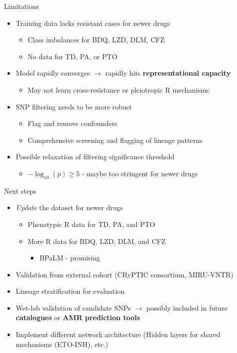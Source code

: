 \documentclass[pdf]{beamer} %
\begin{document}
\begin{frame}{Limitations}
  \begin{itemize}
    \item Training data lacks resistant cases for newer drugs
      \begin{itemize}
        \item Class imbalances for BDQ, LZD, DLM, CFZ
        \item No data for TD, PA, or PTO
      \end{itemize}
    \item Model rapidly converges $\rightarrow$ rapidly hits \textbf{representational capacity}
      \begin{itemize}
        \item May not learn cross-resistance or pleiotropic R mechanisms
      \end{itemize}
    \item SNP filtering needs to be more robust
    \begin{itemize}
      \item Flag and remove confounders
      \item Comprehensive screening and flagging of lineage patterns 
    \end{itemize}
  \item Possible relaxation of filtering significance threshold
    \begin{itemize}
      \item $-\log_{10}(p) \geq 5$ - maybe too stringent for newer drugs
    \end{itemize}
  \end{itemize}
\end{frame}

\begin{frame}{Next steps}
  \begin{itemize}
    \item \textit{Update} the dataset for newer drugs
    \begin{itemize}
      \item Phenotypic R data for TD, PA, and PTO
      \item More R data for BDQ, LZD, DLM, and CFZ
      \begin{itemize}
        \item BPaLM - promising 
      \end{itemize}
    \end{itemize}
    \item Validation from external cohort (CRyPTIC consortium, MIRU-VNTR)
    \item Lineage stratification for evaluation 
    \item Wet-lab validation of candidate SNPs $\rightarrow$ possibly included in future \textbf{catalogues} or \textbf{AMR prediction tools}
    \item Implement different network architecture (Hidden layers for shared mechanisms (ETO-INH), etc.)
  \end{itemize}
\end{frame}
\end{document}
